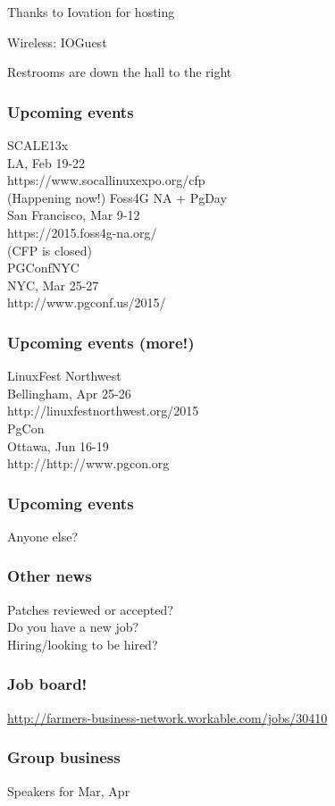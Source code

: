 \documentclass{beamer}
\begin{document}

\frame
{
  \begin{center}
  \item[]Thanks to Iovation for hosting
  \item[]Wireless: IOGuest
  \item[]Restrooms are down the hall to the right
  \end{center}
}

\frame
{
  \frametitle{Upcoming events}
  \begin{center}
{\large SCALE13x\\}
LA, Feb 19-22\\
https://www.socallinuxexpo.org/cfp\\
(Happening now!)
\vspace{5 mm}
{\large Foss4G NA + PgDay\\}
San Francisco, Mar 9-12\\
https://2015.foss4g-na.org/\\
(CFP is closed)\\
\vspace{5 mm}
{\large PGConfNYC\\}
NYC, Mar 25-27\\
http://www.pgconf.us/2015/\\
  \end{center}
}

\frame
{
  \frametitle{Upcoming events (more!)}
  \begin{center}
{\large LinuxFest Northwest\\}
Bellingham, Apr 25-26\\
http://linuxfestnorthwest.org/2015\\
\vspace{5 mm}
{\large PgCon\\}
Ottawa, Jun 16-19\\
http://http://www.pgcon.org\\
  \end{center}
}

\frame
{
  \frametitle{Upcoming events}
  \begin{center}
Anyone else?
  \end{center}
}

\frame
{
  \frametitle{Other news}
  \begin{center}
Patches reviewed or accepted?\\
Do you have a new job?\\
Hiring/looking to be hired?\\
  \end{center}
}

\frame
{
  \frametitle{Job board!}
  \begin{center}
\url{http://farmers-business-network.workable.com/jobs/30410}
  \end{center}
}

\frame
{
  \frametitle{Group business}
  \begin{center}
Speakers for Mar, Apr\\
  \end{center}
}
\end{document}
